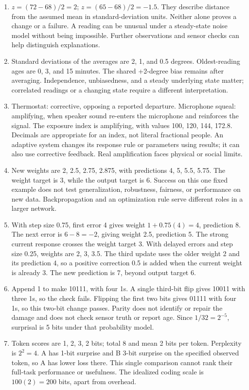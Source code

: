 \documentclass[11pt,letterpaper]{article}
\begin{document}
{\begin{enumerate}
\newpage
\item $z=(72-68)/2=2$; $z=(65-68)/2=-1.5$. They describe distance from the assumed mean in standard-deviation units. Neither alone proves a change or a failure. A reading can be unusual under a steady-state noise model without being impossible. Further observations and sensor checks can help distinguish explanations.
\item Standard deviations of the averages are 2, 1, and 0.5 degrees. Oldest-reading ages are 0, 3, and 15 minutes. The shared +2-degree bias remains after averaging. Independence, unbiasedness, and a steady underlying state matter; correlated readings or a changing state require a different interpretation.
\item Thermostat: corrective, opposing a reported departure. Microphone squeal: amplifying, when speaker sound re-enters the microphone and reinforces the signal. The exposure index is amplifying, with values 100, 120, 144, 172.8. Decimals are appropriate for an index, not literal fractional people. An adaptive system changes its response rule or parameters using results; it can also use corrective feedback. Real amplification faces physical or social limits.
\item New weights are 2, 2.5, 2.75, 2.875, with predictions 4, 5, 5.5, 5.75. The weight target is 3, while the output target is 6. Success on this one fixed example does not test generalization, robustness, fairness, or performance on new data. Backpropagation and an optimization rule serve different roles in a larger network.
\newpage
\item With step size 0.75, first error 4 gives weight $1+0.75(4)=4$, prediction 8. The next error is $6-8=-2$, giving weight 2.5, prediction 5. The strong current response crosses the weight target 3. With delayed errors and step size 0.25, weights are 2, 3, 3.5. The third update uses the older weight 2 and its prediction 4, so a positive correction 0.5 is added when the current weight is already 3. The new prediction is 7, beyond output target 6.
\item Append 1 to make 10111, with four 1s. A single third-bit flip gives 10011 with three 1s, so the check fails. Flipping the first two bits gives 01111 with four 1s, so this two-bit change passes. Parity does not identify or repair the damage and does not check sensor truth or report age. Since $1/32=2^{-5}$, surprisal is 5 bits under that probability model.
\item Token scores are 1, 2, 3, 2 bits; total 8 and mean 2 bits per token. Perplexity is $2^2=4$. A has 1-bit surprise and B 3-bit surprise on the specified observed token, so A has lower loss there. This single comparison cannot rank their full-task performance or usefulness. The idealized coding scale is $100(2)=200$ bits, apart from overhead.

\end{enumerate}}
\end{document}
